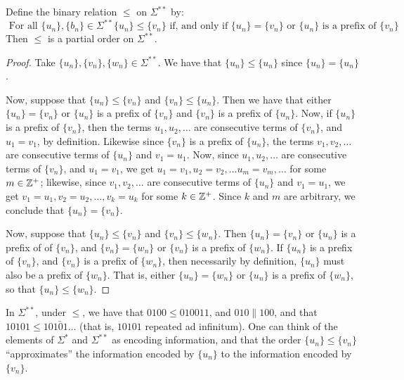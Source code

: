 \begin{proposition}\label{proposition_1.2.2}
  Define the binary relation $\leq$ on  $\Sigma^{\ast\ast}$ by:
  \begin{equation*}
    \text{ For all } \{u_n\}, \{b_n\} \in \Sigma^{\ast\ast}
    \{u_n\} \leq \{v_n\} \text{ if, and only if } \{u_n\}=\{v_n\}
    \text{ or } \{u_n\} \text{ is a prefix of } \{v_n\}
  \end{equation*}
  Then $\leq$ is a partial order on  $\Sigma^{\ast\ast}$.
\end{proposition}
\begin{proof}
  Take $\{u_n\}, \{v_n\}, \{w_n\} \in \Sigma^{\ast\ast}$. We have that
  $\{u_n\} \leq \{u_n\}$ since $\{u_n\}=\{u_n\}$.

  Now, suppose that $\{u_n\} \leq \{v_n\}$ and $\{v_n\} \leq \{u_n\}$.
  Then we have that either $\{u_n\}=\{v_n\}$ or $\{u_n\}$ is a prefix
  of $\{v_n\}$ and $\{v_n\}$ is a prefix of $\{u_n\}$. Now, if
  $\{u_n\}$ is a prefix of $\{v_n\}$, then the terms $u_1, u_2, \dots$
  are consecutive terms of $\{v_n\}$, and $u_1=v_1$, by definition.
  Likewise since $\{v_n\}$ is a prefix of $\{u_n\}$, the terms $v_1,
  v_2, \dots$ are consecutive terms of $\{u_n\}$ and $v_1=u_1$. Now,
  since $u_1, u_2, \dots$ are consecutive terms of $\{v_n\}$, and
  $u_1=v_1$, we get $u_1=v_1, u_2=v_2, \dots u_m=v_m, \dots$ for some
  $m \in \mathbb{Z}^+$; likewise, since $v_1, v_2, \dots$ are consecutive
  terms of $\{u_n\}$ and $v_1=u_1$, we get $v_1=u_1, v_2=u_2, \dots,
  v_k=u_k$ for some $k \in \mathbb{Z}^+$. Since $k$ and $m$ are arbitrary, we
  conclude that $\{u_n\}=\{v_n\}$.

  Now, suppose that $\{u_n\} \leq \{v_n\}$ and $\{v_n\} \leq \{w_n\}$.
  Then $\{u_n\}=\{v_n\}$ or $\{u_n\}$ is a prefix of of $\{v_n\}$, and
  $\{v_n\}=\{w_n\}$ or $\{v_n\}$ is a prefix of $\{w_n\}$. If
  $\{u_n\}$ is a prefix of $\{v_n\}$, and $\{v_n\}$ is a prefix of
  $\{w_n\}$, then necessarily by definition, $\{u_n\}$ must also be a
  prefix of $\{w_n\}$. That is, either $\{u_n\}=\{w_n\}$ or $\{u_n\}$
  is a prefix of $\{w_n\}$, so that $\{u_n\} \leq \{w_n\}$.
\end{proof}

\begin{example}\label{example_1.4}
  In $\Sigma^{\ast\ast}$, under $\leq$, we have that  $0100 \leq
  010011$, and $010 \| 100$, and that  $10101 \leq \bar{10101\dots}$
  (that is, $10101$ repeated ad infinitum). One can think of the
  elements of $\Sigma^{\ast}$ and $\Sigma^{\ast\ast}$ as encoding
  information, and that the order $\{u_n\} \leq \{v_n\}$
  ``approximates'' the information encoded by $\{u_n\}$ to the
  information encoded by $\{v_n\}$.
\end{example}

